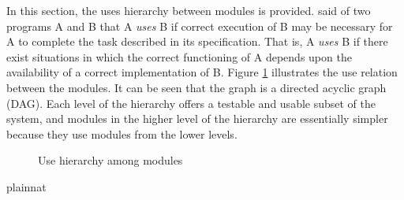 \documentclass[12pt, titlepage]{article}
\begin{document}
In this section, the uses hierarchy between modules is
provided. \citet{Parnas1978} said of two programs A and B that A {\em uses} B if
correct execution of B may be necessary for A to complete the task described in
its specification. That is, A {\em uses} B if there exist situations in which
the correct functioning of A depends upon the availability of a correct
implementation of B.  Figure \ref{FigUH} illustrates the use relation between
the modules. It can be seen that the graph is a directed acyclic graph
(DAG). Each level of the hierarchy offers a testable and usable subset of the
system, and modules in the higher level of the hierarchy are essentially simpler
because they use modules from the lower levels.

\begin{figure}[H]
\centering
\caption{Use hierarchy among modules}
\label{FigUH}
\end{figure}


 {plainnat}


\newpage{}
\end{document}
